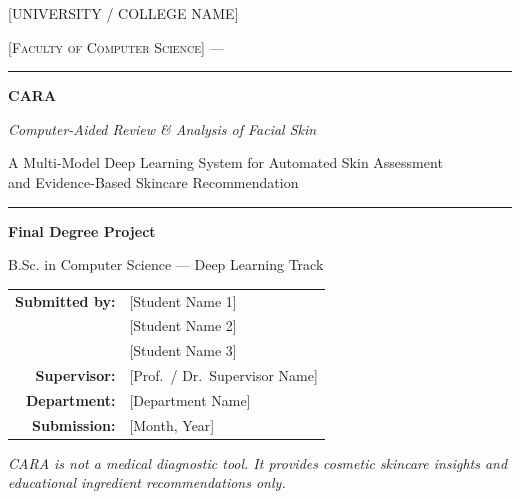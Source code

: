 \documentclass[11pt,a4paper,oneside]{report}
\begin{document}

\begin{titlepage}
    \centering
    \vspace*{0.5cm}
    {\scshape\large \textcolor{caraprimary}{[UNIVERSITY / COLLEGE NAME]}\par}
    {\scshape\normalsize [Faculty of Computer Science] \quad --- \par}
    \vspace{2.5cm}

    \rule{\linewidth}{1.2pt}\vspace{0.4cm}
    {\Huge\bfseries \textcolor{caraprimary}{CARA}\par}
    \vspace{0.3cm}
    {\LARGE\itshape Computer-Aided Review \& Analysis of Facial Skin\par}
    \vspace{0.4cm}
    {\large A Multi-Model Deep Learning System for Automated Skin Assessment\\ and Evidence-Based Skincare Recommendation\par}
    \vspace{0.2cm}
    \rule{\linewidth}{1.2pt}

    \vspace{2.0cm}
    {\large \textbf{Final Degree Project}\par}
    {\normalsize B.Sc. in Computer Science --- Deep Learning Track\par}

    \vfill
    \begin{tabular}{rl}
        \textbf{Submitted by:} & [Student Name 1] \\
                               & [Student Name 2] \\
                               & [Student Name 3] \\
        \textbf{Supervisor:}   & [Prof.\ / Dr.\ Supervisor Name] \\
        \textbf{Department:}   & [Department Name] \\
        \textbf{Submission:}   & [Month, Year] \\
    \end{tabular}

    \vspace{1.2cm}
    {\footnotesize \textit{CARA is not a medical diagnostic tool.
    It provides cosmetic skincare insights and educational ingredient
    recommendations only.}\par}
\end{titlepage}
\end{document}
